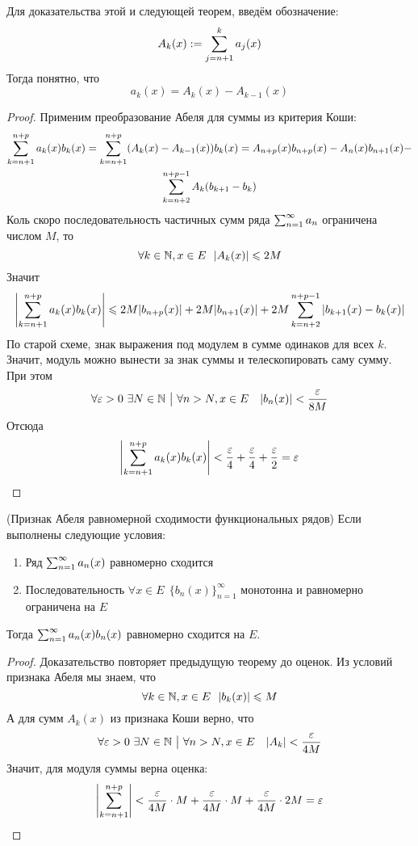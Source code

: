 \begin{note}
	Для доказательства этой и следующей теорем, введём обозначение:
	\[
		A_k(x) := \sum\limits_{j = n + 1}^k a_j(x)
	\]
	Тогда понятно, что
	\[
		a_k(x) = A_k(x) - A_{k - 1}(x)
	\]
\end{note}

\begin{proof}
	Применим преобразование Абеля для суммы из критерия Коши:
	\begin{multline*}
		\sum\limits_{k = n + 1}^{n + p} a_k(x)b_k(x) = \sum\limits_{k = n + 1}^{n + p} (A_k(x) - A_{k - 1}(x))b_k(x) = A_{n + p}(x) b_{n + p}(x) - A_n(x)b_{n + 1}(x) -
		\\
		\sum\limits_{k = n + 2}^{n + p - 1} A_k(b_{k + 1} - b_k)
	\end{multline*}
	Коль скоро последовательность частичных сумм ряда $\sum_{n = 1}^\infty a_n$ ограничена числом $M$, то
	\[
		\forall k \in \mathbb{N}, x \in E\ \ |A_k(x)| \leqslant 2M
	\]
	Значит
	\[
		\left|\sum\limits_{k = n + 1}^{n + p} a_k(x)b_k(x)\right| \leqslant 2M |b_{n + p}(x)| + 2M |b_{n + 1}(x)| + 2M \sum\limits_{k = n + 2}^{n + p - 1} |b_{k + 1}(x) - b_k(x)|
	\]
	По старой схеме, знак выражения под модулем в сумме одинаков для всех $k$. Значит, модуль можно вынести за знак суммы и телескопировать саму сумму. При этом
	\[
		\forall \varepsilon > 0\ \exists N \in \mathbb{N} \ \big|\  \forall n > N, x \in E \quad |b_n(x)| < \frac{\varepsilon}{8M}
	\]
	Отсюда
	\[
		\left|\sum\limits_{k = n + 1}^{n + p} a_k(x)b_k(x)\right| < \frac{\varepsilon}{4} + \frac{\varepsilon}{4} + \frac{\varepsilon}{2} = \varepsilon
	\]
\end{proof}

\begin{theorem} (Признак Абеля равномерной сходимости функциональных рядов)
	Если выполнены следующие условия:
	\begin{enumerate}
		\item Ряд $\sum_{n = 1}^\infty a_n(x)$ равномерно сходится
		
		\item Последовательность $\forall x \in E\ \ \{b_n(x)\}_{n = 1}^\infty$ монотонна и равномерно ограничена на $E$
	\end{enumerate}
	Тогда $\sum_{n = 1}^\infty a_n(x)b_n(x)$ равномерно сходится на $E$.
\end{theorem}

\begin{proof}
	Доказательство повторяет предыдущую теорему до оценок. Из условий признака Абеля мы знаем, что
	\[
		\forall k \in \mathbb{N}, x \in E\ \ |b_k(x)| \leqslant M
	\]
	А для сумм $A_k(x)$ из признака Коши верно, что
	\[
		\forall \varepsilon > 0\ \exists N \in \mathbb{N} \ \big|\  \forall n > N, x \in E \quad |A_k| < \frac{\varepsilon}{4M}
	\]
	Значит, для модуля суммы верна оценка:
	\[
		\left|\sum\limits_{k = n + 1}^{n + p}\right| < \frac{\varepsilon}{4M} \cdot M + \frac{\varepsilon}{4M} \cdot M + \frac{\varepsilon}{4M} \cdot 2M = \varepsilon
	\]
\end{proof}